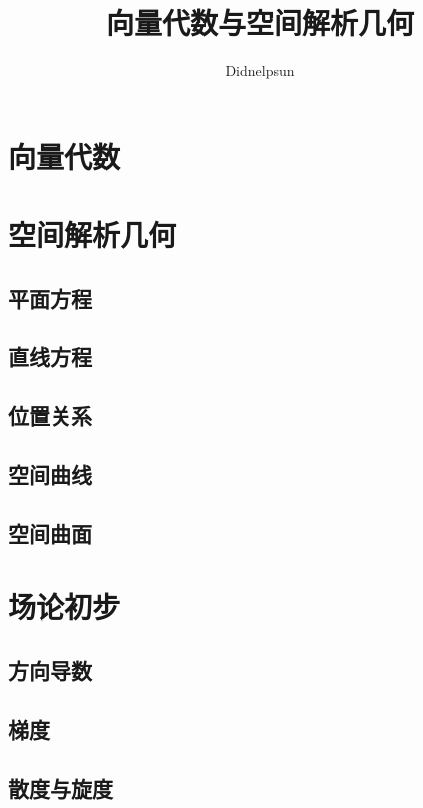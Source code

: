 \documentclass[UTF8, 12pt]{ctexart}
\author{Didnelpsun}
\title{向量代数与空间解析几何}
\date{}
\begin{document}
\maketitle
\pagestyle{empty}
\thispagestyle{empty}
\tableofcontents
\thispagestyle{empty}
\newpage
\pagestyle{plain}
\setcounter{page}{1}
\section{向量代数}

\section{空间解析几何}

\subsection{平面方程}

\subsection{直线方程}

\subsection{位置关系}

\subsection{空间曲线}

\subsection{空间曲面}

\section{场论初步}

\subsection{方向导数}

\subsection{梯度}

\subsection{散度与旋度}
\end{document}

